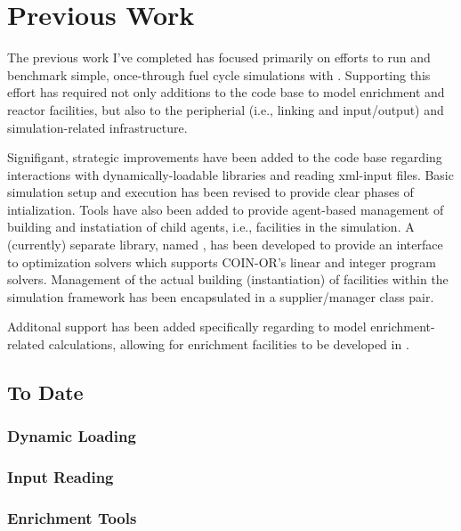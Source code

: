 \chapter{Previous Work}\label{ch:prevwork}

The previous work I've completed has focused primarily on efforts to run and
benchmark simple, once-through fuel cycle simulations with \Cyclus. Supporting
this effort has required not only additions to the \Cyclus code base to model
enrichment and reactor facilities, but also to the peripherial (i.e., linking
and input/output) and simulation-related infrastructure.

Signifigant, strategic improvements have been added to the \Cyclus code base
regarding interactions with dynamically-loadable libraries and reading xml-input
files. Basic simulation setup and execution has been revised to provide clear
phases of intialization. Tools have also been added to provide agent-based
management of building and instatiation of child agents, i.e., facilities in the
\Cyclus simulation. A (currently) separate library, named \Cyclopts, has been
developed to provide an interface to optimization solvers which supports
COIN-OR's linear and integer program solvers. Management of the actual building
(instantiation) of facilities within the simulation framework has been
encapsulated in a supplier/manager class pair.

Additonal support has been added specifically regarding to model
enrichment-related calculations, allowing for enrichment facilities to be
developed in \Cycamore. 

\section{\Cyclus To Date}

\subsection{Dynamic Loading}\label{sec:prev-dynamic}

\subsection{Input Reading}

\subsection{Enrichment Tools}\label{sec:prev-enrich}


